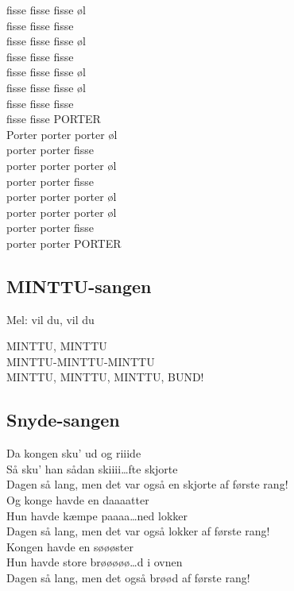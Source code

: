 fisse fisse fisse øl\\
fisse fisse fisse\\
fisse fisse fisse øl\\
fisse fisse fisse\\
fisse fisse fisse øl\\
fisse fisse fisse øl\\
fisse fisse fisse\\
fisse fisse PORTER\\ 

Porter porter porter øl\\
porter porter fisse\\
porter porter porter øl\\
porter porter fisse\\
porter porter porter øl\\
porter porter porter øl\\
porter porter fisse\\
porter porter PORTER\\ 

\subsection*{MINTTU-sangen}

Mel: vil du, vil du

MINTTU, MINTTU\\
MINTTU-MINTTU-MINTTU\\ 
MINTTU, MINTTU, MINTTU, BUND!\\

\subsection*{Snyde-sangen}

Da kongen sku’ ud og riiide\\
Så sku’ han sådan skiiii…fte skjorte\\
Dagen så lang, men det var også en skjorte af første rang!\\

Og konge havde en daaaatter\\
Hun havde kæmpe paaaa…ned lokker\\
Dagen så lang, men det var også lokker af første rang!\\

Kongen havde en søøøster\\
Hun havde store brøøøøø…d i ovnen\\
Dagen så lang, men det også brøød af første rang!\\

